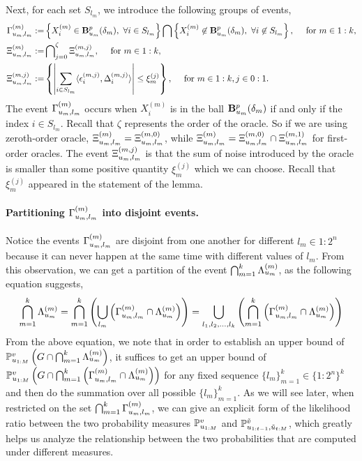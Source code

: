 Next, for each set $S_{l_m}$, we introduce the following groups of events,
\begin{align*}
	\Gamma_{u_{m},l_{m}}^{({m})} := &\left\{ X_i^{(m)} \in \mathbf{B}^p_{u_{m}}({\delta_{m}}), ~\forall i \in S_{l_m} \right\} \bigcap \left\{ X_i^{(m)} 
	\not\in \mathbf{B}^p_{u_{m}}({\delta_{m}}), ~\forall i \not\in S_{l_m} \right\}, \quad \textup{ for } m \in 1:k,\\
	\Xi_{u_{m},l_{m}}^{({m})} := & \bigcap\nolimits_{j=0}^{\zeta} \Xi_{u_{m},l_{m}}^{({m},{{j}})}, \quad \textup{ for } m \in 1:k,\\
	\Xi_{u_{m},l_{m}}^{({m},{{j}})} := & \left\{ \left| \sum_{i\in S_{l_m}} \langle \epsilon^{(m,j)}_i, \Delta^{(m,j)}_i\rangle \right| \leq \xi_m^{(j)} \right\},
	\quad \textup { for } m \in 1:k, j \in 0:1.
\end{align*}
The event $\Gamma_{u_{m},l_{m}}^{({m})}$ occurs when $X_i^{(m)}$ is in the ball $\mathbf{B}^p_{u_{m}}({\delta_{m}})$ if and only if the index $i \in S_{l_m}$. 
Recall that $\zeta$ represents the order of the oracle. So if we are using zeroth-order oracle,
$\Xi_{u_{m},l_{m}}^{({m})}  = \Xi_{u_{{m}},l_{{m}}}^{({{m}},{0})}$, while $\Xi_{u_{m},l_{m}}^{({m})} = \Xi_{u_{{m}},l_{{m}}}^{({{m}},{0})} \cap \Xi_{u_{{m}},l_{{m}}}^{({{m}},{1})}$ for first-order oracles.
The event $\Xi_{u_{m},l_{m}}^{({m},{{j}})}$ is that the sum of noise introduced by the oracle is smaller than some positive quantity $\xi_m^{(j)}$ which we can choose. Recall that $\xi_m^{(j)}$ appeared in the statement of the lemma. 

\paragraph{Partitioning  $\Gamma_{u_{m},l_{m}}^{({m})}$ into disjoint events.}
Notice the events $\Gamma_{u_{m},l_{m}}^{({m})}$ are disjoint from one another for different $l_m \in 1:2^n$ because it can never happen at the same time with different values of $l_m$.
From this observation, we can get a partition of the event $\bigcap_{m=1}^{k} \Lambda_{u_{m}}^{({m})}$, 
as the following equation suggests, 
\begin{equation*}
	\bigcap_{m=1}^{k} \Lambda_{u_{m}}^{({m})} 
	= \bigcap_{m=1}^{k} \left( \bigcup_{l_m} \left(\Gamma_{u_{m},l_{m}}^{({m})} \cap \Lambda_{u_{m}}^{({m})} \right)\right) 
	= \bigcup_{l_1, l_2, \ldots, l_{k}} \left( \bigcap_{m=1}^{k} \left( \Gamma_{u_{m},l_{m}}^{({m})} \cap \Lambda_{u_{m}}^{({m})} \right) \right)
\end{equation*}
From the above equation, we note that in order to establish an upper bound of 
$\mathbb{P}_{u_{1:M}}^v \left( G \cap \bigcap_{m=1}^{k} \Lambda_{u_{m}}^{({m})} \right)$, it suffices to get an upper bound of 
$\mathbb{P}_{u_{1:M}}^v \left( G \cap \bigcap_{m=1}^{k} \left( \Gamma_{u_{m},l_{m}}^{({m})} \cap \Lambda_{u_{m}}^{({m})} \right) \right)$ 
for any fixed sequence $\{l_m\}_{m=1}^{k} \in \{1:2^{n}\}^{k}$ and then do the summation over all possible $\{l_m\}_{m=1}^{k}$.
As we will see later, when restricted on the set 
$ \bigcap_{m=1}^{k} \Gamma_{u_{m},l_{m}}^{({m})}$, we can give an explicit form of the likelihood ratio between 
the two probability measures $\mathbb{P}_{u_{1:M}}^v$ and $\mathbb{P}_{u_{1:t-1}, \tilde u_{t:M}}^{\tilde v}$, which greatly helps us 
analyze the relationship between the two probabilities that are computed under different measures. 

